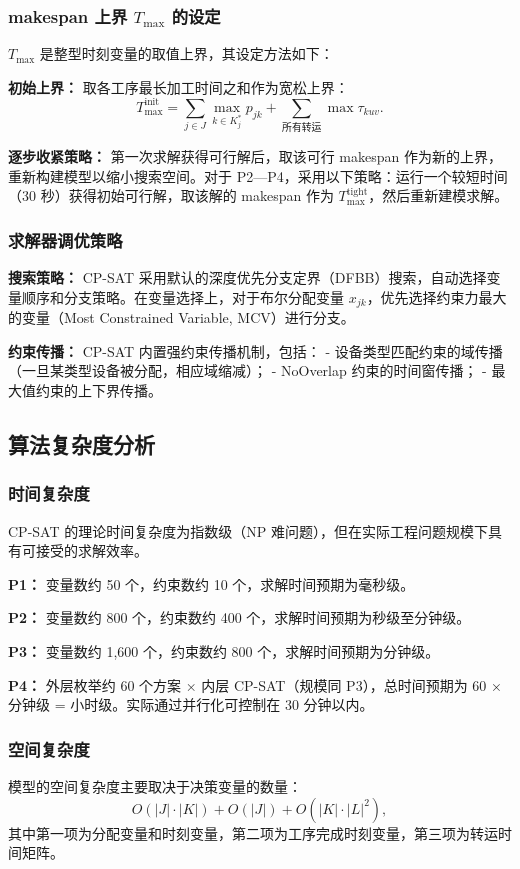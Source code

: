 \documentclass[UTF8,a4paper,12pt]{ctexart}
\begin{document}
\subsubsection{makespan 上界 $T_{\max}$ 的设定}
$T_{\max}$ 是整型时刻变量的取值上界，其设定方法如下：

\textbf{初始上界：} 取各工序最长加工时间之和作为宽松上界：
\begin{equation}
T_{\max}^{\text{init}} = \sum_{j \in J} \max_{k \in K_j^*} p_{jk} + \sum_{\text{所有转运}} \max \tau_{kuv}.
\end{equation}

\textbf{逐步收紧策略：} 第一次求解获得可行解后，取该可行 makespan 作为新的上界，重新构建模型以缩小搜索空间。对于 P2—P4，采用以下策略：运行一个较短时间（30 秒）获得初始可行解，取该解的 makespan 作为 $T_{\max}^{\text{tight}}$，然后重新建模求解。

\subsubsection{求解器调优策略}
\textbf{搜索策略：} CP-SAT 采用默认的深度优先分支定界（DFBB）搜索，自动选择变量顺序和分支策略。在变量选择上，对于布尔分配变量 $x_{jk}$，优先选择约束力最大的变量（Most Constrained Variable, MCV）进行分支。

\textbf{约束传播：} CP-SAT 内置强约束传播机制，包括：
- 设备类型匹配约束的域传播（一旦某类型设备被分配，相应域缩减）；
- NoOverlap 约束的时间窗传播；
- 最大值约束的上下界传播。

\subsection{算法复杂度分析}
\subsubsection{时间复杂度}
CP-SAT 的理论时间复杂度为指数级（NP 难问题），但在实际工程问题规模下具有可接受的求解效率。

\textbf{P1：} 变量数约 50 个，约束数约 10 个，求解时间预期为毫秒级。

\textbf{P2：} 变量数约 800 个，约束数约 400 个，求解时间预期为秒级至分钟级。

\textbf{P3：} 变量数约 1,600 个，约束数约 800 个，求解时间预期为分钟级。

\textbf{P4：} 外层枚举约 60 个方案 × 内层 CP-SAT（规模同 P3），总时间预期为 60 × 分钟级 = 小时级。实际通过并行化可控制在 30 分钟以内。

\subsubsection{空间复杂度}
模型的空间复杂度主要取决于决策变量的数量：
\begin{equation}
O(|J| \cdot |K|) + O(|J|) + O(|K| \cdot |L|^2),
\end{equation}
其中第一项为分配变量和时刻变量，第二项为工序完成时刻变量，第三项为转运时间矩阵。
\end{document}
